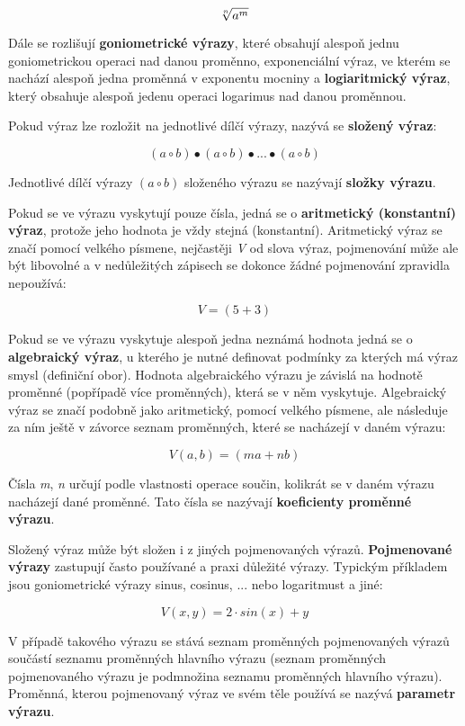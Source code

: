 $$ \root n\of{a^m} $$

Dále se rozlišují {\bf goniometrické výrazy}, které obsahují alespoň jednu goniometrickou operaci nad danou proměnno, {exponenciální výraz}, ve kterém se nachází alespoň jedna proměnná v exponentu mocniny a {\bf logiaritmický výraz}, který obsahuje alespoň jedenu operaci logarimus nad danou proměnnou.


Pokud výraz lze rozložit na jednotlivé dílčí výrazy, nazývá se {\bf složený výraz}:

$$ (a \circ b) \bullet (a \circ b) \bullet ... \bullet (a \circ b) $$

Jednotlivé dílčí výrazy $(a \circ b)$ složeného výrazu se nazývají {\bf složky výrazu}.

Pokud se ve výrazu vyskytují pouze čísla, jedná se o {\bf aritmetický (konstantní) výraz}, protože jeho hodnota je vždy stejná (konstantní). Aritmetický výraz se značí pomocí velkého písmene, nejčastěji {\it V} od slova výraz, pojmenování může ale být libovolné a v nedůležitých zápisech se dokonce žádné pojmenování zpravidla nepoužívá:

$$ V = (5 + 3) $$

Pokud se ve výrazu vyskytuje alespoň jedna neznámá hodnota jedná se o {\bf algebraický výraz}, u kterého je nutné definovat podmínky za kterých má výraz smysl (definiční obor). Hodnota algebraického výrazu je závislá na hodnotě proměnné (popřípadě více proměnných), která se v něm vyskytuje. Algebraický výraz se značí podobně jako aritmetický, pomocí velkého písmene, ale následuje za ním ještě v závorce seznam proměnných, které se nacházejí v daném výrazu:

$$ V(a,b) = (ma + nb) $$

Čísla {\it m}, {\it n} určují podle vlastnosti operace součin, kolikrát se v daném výrazu nacházejí dané proměnné. Tato čísla se nazývají {\bf koeficienty proměnné výrazu}.

Složený výraz může být složen i z jiných pojmenovaných výrazů. {\bf Pojmenované výrazy} zastupují často používané a praxi důležité výrazy. Typickým příkladem jsou goniometrické výrazy sinus, cosinus, ... nebo logaritmust a jiné:

$$ V(x,y) = 2\cdot sin(x) + y $$

V případě  takového výrazu se stává seznam proměnných pojmenovaných výrazů součástí seznamu proměnných hlavního výrazu (seznam proměnných pojmenovaného výrazu je podmnožina seznamu proměnných hlavního výrazu). Proměnná, kterou pojmenovaný výraz ve svém těle používá se nazývá {\bf parametr výrazu}. 

